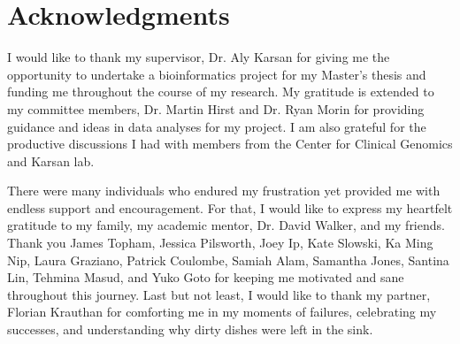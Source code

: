 
\chapter{Acknowledgments}

I would like to thank my supervisor, Dr. Aly Karsan for giving me the opportunity to undertake a bioinformatics project for my Master's thesis and funding me throughout the course of my research. My gratitude is extended to my committee members, Dr. Martin Hirst and Dr. Ryan Morin for providing guidance and ideas in data analyses for my project. I am also grateful for the productive discussions I had with members from the Center for Clinical Genomics and Karsan lab.

There were many individuals who endured my frustration yet provided me with endless support and encouragement. For that, I would like to express my heartfelt gratitude to my family, my academic mentor, Dr. David Walker, and my friends. Thank you James Topham, Jessica Pilsworth, Joey Ip, Kate Slowski, Ka Ming Nip, Laura Graziano, Patrick Coulombe, Samiah Alam, Samantha Jones, Santina Lin, Tehmina Masud, and Yuko Goto for keeping me motivated and sane throughout this journey. Last but not least, I would like to thank my partner, Florian Krauthan for comforting me in my moments of failures, celebrating my successes, and understanding why dirty dishes were left in the sink.
